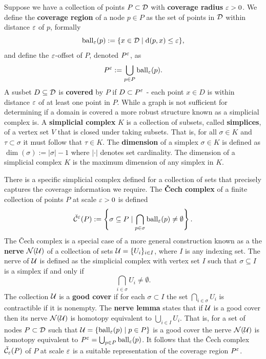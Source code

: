 Suppose we have a collection of points $P\subset{\mathcal{D}}$ with \textbf{coverage radius} $\varepsilon > 0$.
We define the \textbf{coverage region} of a node $p\in P$ as the set of points in ${\mathcal{D}}$ within distance $\varepsilon$ of $p$, formally
\[ \mathrm{ball}_\varepsilon(p) := \{x\in{\mathcal{D}}\mid \mathrm{d}(p, x)\leq\varepsilon\}, \]
and define the $\varepsilon$-offset of $P$, denoted $P^\varepsilon$, as
\[ P^\varepsilon := \bigcup_{p\in P}\mathrm{ball}_\varepsilon(p).\]
A susbet $D\subseteq{\mathcal{D}}$ is \textbf{covered} by $P$ if $D\subset P^\varepsilon$ - each point $x\in D$ is within distance $\varepsilon$ of at least one point in $P$.
While a graph is not sufficient for determining if a domain is covered a more robust structure known as a simplicial complex is.
A \textbf{simplicial complex} $K$ is a collection of subsets, called \textbf{simplices}, of a vertex set $V$ that is closed under taking subsets.
That is, for all $\sigma\in K$ and $\tau\subset\sigma$ it must follow that $\tau\in K$.
The \textbf{dimension} of a simplex $\sigma\in K$ is defined as $\dim(\sigma) := |\sigma|-1$ where $|\cdot|$ denotes set cardinality.
The dimension of a simplicial complex $K$ is the maximum dimension of any simplex in $K$.

There is a specific simplicial complex defined for a collection of sets that precisely captures the coverage information we require.
The \textbf{\v Cech complex} of a finite collection of points $P$ at scale $\varepsilon > 0$ is defined
\[ \check{\mathcal{C}}^\varepsilon(P) := \left\{\sigma \subseteq P\mid \bigcap_{p\in \sigma}\mathrm{ball}_\varepsilon(p)\neq \emptyset \right\}. \]
The \v Cech complex is a special case of a more general construction known as a the \textbf{nerve} $\mathcal{N}({\mathcal{U}})$ of a collection of sets ${\mathcal{U}} = \{U_i\}_{i\in I}$, where $I$ is any indexing set.
The nerve of ${\mathcal{U}}$ is defined as the simplicial complex with vertex set $I$ such that $\sigma\subseteq I$ is a simplex if and only if \[\bigcap_{i\in \sigma} U_i\neq \emptyset.\]
The collection ${\mathcal{U}}$ is a \textbf{good cover} if for each $\sigma\subset I$ the set $\bigcap_{i\in\sigma} U_i$ is contractible if it is nonempty.
The \textbf{nerve lemma} states that if ${\mathcal{U}}$ is a good cover then its nerve $\mathcal{N}({\mathcal{U}})$ is homotopy equivalent to $\bigcup_{i\in I} U_i$.
That is, for a set of nodes $P\subset{\mathcal{D}}$ such that ${\mathcal{U}} = \{\mathrm{ball}_\varepsilon(p)\mid p\in P\}$ is a good cover the nerve $\mathcal{N}({\mathcal{U}})$ is homotopy equivalent to $P^\varepsilon = \bigcup_{p\in P} \mathrm{ball}_\varepsilon(p)$.
It follows that the \v Cech complex $\check{\mathcal{C}}_\varepsilon(P)$ of $P$ at scale $\varepsilon$ is a suitable representation of the coverage region $P^\varepsilon$.

